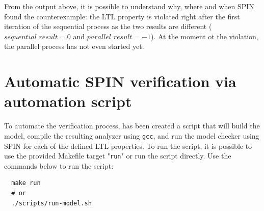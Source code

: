 \documentclass[a4paper, 11pt]{article}
\begin{document}
From the output above, it is possible to understand why, where and when SPIN found the counterexample: the LTL property is violated right after the first iteration of the sequential process as the two results are different ($sequential\_result = 0$ and $parallel\_result = -1$). At the moment ot the violation, the parallel process has not even started yet.

\section{Automatic SPIN verification via automation script}

To automate the verification process, has been created a script that will build the model, compile the resulting analyzer using \texttt{gcc}, and run the model checker using SPIN for each of the defined LTL properties. To run the script, it is possible to use the provided Makefile target "\texttt{run}" or run the script directly. Use the commands below to run the script:

\begin{lstlisting}
  make run
  # or
  ./scripts/run-model.sh
\end{lstlisting}
\end{document}
